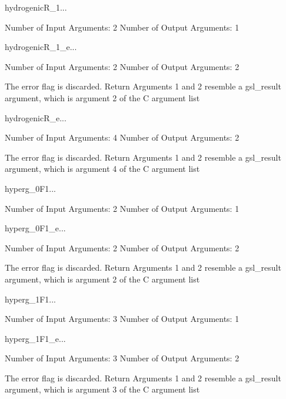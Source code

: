 \begin{funcdesc}{hydrogenicR_1}{...}

    Number of Input  Arguments:  2
    Number of Output Arguments:  1
\end{funcdesc}

\begin{funcdesc}{hydrogenicR_1_e}{...}

    Number of Input  Arguments:  2
    Number of Output Arguments:  2

The error flag is discarded.
Return Arguments 1 and 2 resemble a gsl_result argument,
	which is  argument 2 of the C argument list

\end{funcdesc}

\begin{funcdesc}{hydrogenicR_e}{...}

    Number of Input  Arguments:  4
    Number of Output Arguments:  2

The error flag is discarded.
Return Arguments 1 and 2 resemble a gsl_result argument,
	which is  argument 4 of the C argument list

\end{funcdesc}

\begin{funcdesc}{hyperg_0F1}{...}

    Number of Input  Arguments:  2
    Number of Output Arguments:  1
\end{funcdesc}

\begin{funcdesc}{hyperg_0F1_e}{...}

    Number of Input  Arguments:  2
    Number of Output Arguments:  2

The error flag is discarded.
Return Arguments 1 and 2 resemble a gsl_result argument,
	which is  argument 2 of the C argument list

\end{funcdesc}

\begin{funcdesc}{hyperg_1F1}{...}

    Number of Input  Arguments:  3
    Number of Output Arguments:  1
\end{funcdesc}

\begin{funcdesc}{hyperg_1F1_e}{...}

    Number of Input  Arguments:  3
    Number of Output Arguments:  2

The error flag is discarded.
Return Arguments 1 and 2 resemble a gsl_result argument,
	which is  argument 3 of the C argument list

\end{funcdesc}

